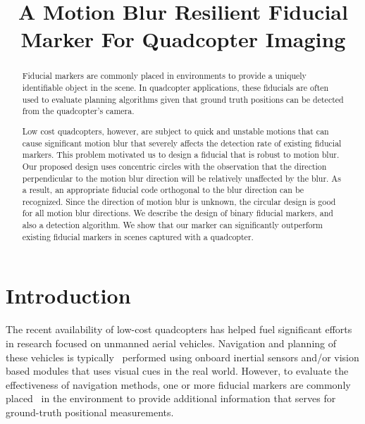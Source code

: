 \documentclass[10pt,twocolumn,letterpaper]{article}
\begin{document}
\title{A Motion Blur Resilient Fiducial Marker For Quadcopter Imaging}
\maketitle

\begin{abstract}

  Fiducial markers are commonly placed in environments to provide a
  uniquely identifiable object in the scene.  In quadcopter
  applications, these fiducials are often used to evaluate planning
  algorithms given that ground truth positions can be
  detected from the quadcopter's camera. 

  Low cost quadcopters, however, are subject to quick and unstable
  motions that can cause significant motion blur that severely affects
  the detection rate of existing fiducial markers. This problem
  motivated us to design a fiducial that is robust to motion blur. Our
  proposed design uses concentric circles with the observation that
  the direction perpendicular to the motion blur direction will be
  relatively unaffected by the blur. As a result, an appropriate
  fiducial code orthogonal to the blur direction can be
  recognized. Since the direction of motion blur is unknown, the
  circular design is good for all motion blur directions. We describe
  the design of binary fiducial markers, and also a detection
  algorithm.  We show that our marker can significantly outperform
  existing fiducial markers in scenes captured with a quadcopter.

\end{abstract}

\section{Introduction}

The recent availability of low-cost quadcopters has helped  fuel
significant efforts in research focused on unmanned aerial
vehicles. Navigation and planning
of these vehicles is typically~\cite{Davison:2007,Engel12,Engel13}
performed using onboard inertial sensors and/or vision based modules
that uses visual cues in the real world. However, to evaluate the
effectiveness of navigation methods, one or more fiducial markers are commonly
placed~\cite{Bosnak:2012,Lim09,Klopschitz:2007}
 in the environment to provide additional information that
serves for ground-truth positional measurements.
\end{document}
